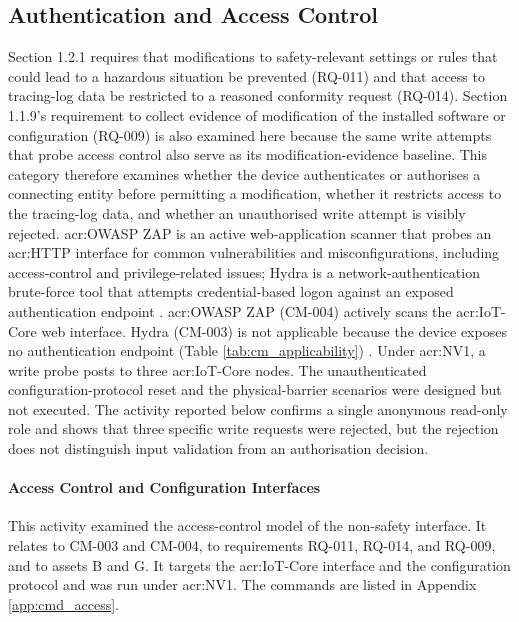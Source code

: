 \subsection{Authentication and Access Control}
\label{subsec:cat_access}
Section 1.2.1 requires that modifications to safety-relevant settings or rules that could lead to a hazardous situation be prevented (RQ-011) and that access to tracing-log data be restricted to a reasoned conformity request (RQ-014). Section 1.1.9's requirement to collect evidence of modification of the installed software or configuration (RQ-009) is also examined here because the same write attempts that probe access control also serve as its modification-evidence baseline. This category therefore examines whether the device authenticates or authorises a connecting entity before permitting a modification, whether it restricts access to the tracing-log data, and whether an unauthorised write attempt is visibly rejected. \gls{acr:OWASP} ZAP is an active web-application scanner that probes an \gls{acr:HTTP} interface for common vulnerabilities and misconfigurations, including access-control and privilege-related issues; Hydra is a network-authentication brute-force tool that attempts credential-based logon against an exposed authentication endpoint \cite{zaproxy_getting_started}. \gls{acr:OWASP} ZAP (CM-004) actively scans the \gls{acr:IoT}-Core web interface. Hydra (CM-003) is not applicable because the device exposes no authentication endpoint (Table \ref{tab:cm_applicability}) \cite{kali_hydra}.
Under \gls{acr:NV1}, a write probe posts to three \gls{acr:IoT}-Core nodes. The unauthenticated configuration-protocol reset and the physical-barrier scenarios were designed but not executed. The activity reported below confirms a single anonymous read-only role and shows that three specific write requests were rejected, but the rejection does not distinguish input validation from an authorisation decision.

\paragraph{Access Control and Configuration Interfaces} 
\label{subsec:res_access_control}
This activity examined the access-control model of the non-safety interface. It relates to CM-003 and CM-004, to requirements RQ-011, RQ-014, and RQ-009, and to assets B and G. It targets the \gls{acr:IoT}-Core interface and the configuration protocol and was run under \gls{acr:NV1}. The commands are listed in Appendix \ref{app:cmd_access}.

